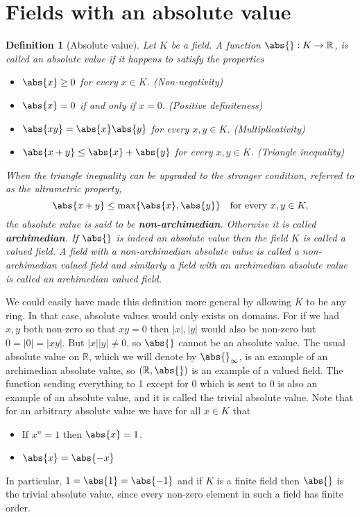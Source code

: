 \documentclass{article}
\newtheorem{definition}{Definition}[section]
\newcommand{\mbb}[1]{\mathbb{#1}}
\numberwithin{equation}{section}
\begin{document}
\section{Fields with an absolute value}

\begin{definition}[Absolute value]
	Let $K$ be a field. A function $\abs{} : K \to \mbb R$, is called an absolute value if it happens to satisfy the properties
	\begin{itemize}
    	\item $\abs{x} \geq 0$ for every $x \in K$. (Non-negativity)
    	\item $\abs{x} = 0$ if and only if $x = 0$. (Positive definiteness)
    	\item $\abs{xy} = \abs{x} \abs{y}$ for every $x,y \in K$. (Multiplicativity)
    	\item $\abs{x + y} \leq \abs{x} + \abs{y}$ for every $x,y \in K$. (Triangle inequality)
	\end{itemize}
	When the triangle inequality can be upgraded to the stronger condition, referred to as the ultrametric property,  $$\abs{x + y} \leq \max \{\abs{x}, \abs{y}\} \quad \text{for every } x,y \in K,$$
	the absolute value is said to be \textbf{non-archimedian}. Otherwise it is called \textbf{archimedian}. If $\abs{}$ is indeed an absolute value then the field $K$ is called a valued field. A field with a non-archimedian absolute value is called a non-archimedian valued field and similarly a field with an archimedian absolute value is called an archimedian valued field.
\end{definition}
We could easily have made this definition more general by allowing $K$ to be any ring. In that case, absolute values would only exists on domains. For if we had $x,y$ both non-zero so that $xy = 0$ then $|x|, |y|$ would also be non-zero but $0 = |0| = |xy|$. But $|x||y| \neq 0$, so $\abs{}$ cannot be an absolute value. The usual absolute value on $\mbb R$, which we will denote by $\abs{}_\infty$,  is an example of an archimedian absolute value, so $(\mbb R, \abs{})$ is an example of a valued field. The function sending everything to 1 except for 0 which is sent to 0 is also an example of an absolute value, and it is called the trivial absolute value. Note that for an arbitrary absolute value we have for all $x \in K$ that
\begin{itemize}
	\item If $x^n = 1$ then $\abs{x} = 1$.
	\item $\abs{x} = \abs{-x}$
\end{itemize}
In particular, $1 = \abs{1} = \abs{-1}$ and if $K$ is a finite field then $\abs{}$ is the trivial absolute value, since every non-zero element in such a field has finite order.
\end{document}
